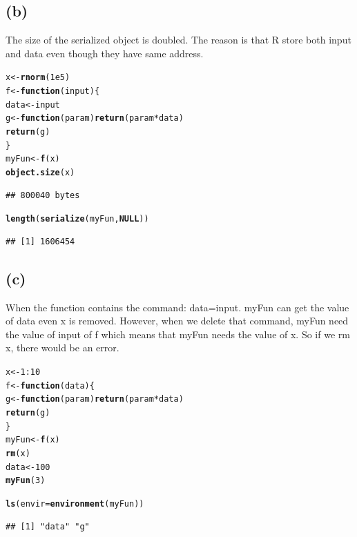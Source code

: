 \documentclass{article}\usepackage[]{graphicx}\usepackage[]{color}
\makeatletter
\newcommand{\hlnum}[1]{\textcolor[rgb]{0.686,0.059,0.569}{#1}}%
\newcommand{\hlopt}[1]{\textcolor[rgb]{0,0,0}{#1}}%
\newcommand{\hlstd}[1]{\textcolor[rgb]{0.345,0.345,0.345}{#1}}%
\newcommand{\hlkwa}[1]{\textcolor[rgb]{0.161,0.373,0.58}{\textbf{#1}}}%
\newcommand{\hlkwb}[1]{\textcolor[rgb]{0.69,0.353,0.396}{#1}}%
\newcommand{\hlkwc}[1]{\textcolor[rgb]{0.333,0.667,0.333}{#1}}%
\newcommand{\hlkwd}[1]{\textcolor[rgb]{0.737,0.353,0.396}{\textbf{#1}}}%
\newenvironment{kframe}{%
 \def\at@end@of@kframe{}%
 \ifinner\ifhmode%
  \def\at@end@of@kframe{\end{minipage}}%
  \begin{minipage}{\columnwidth}%
 \fi\fi%
 \def\FrameCommand##1{\hskip\@totalleftmargin \hskip-\fboxsep
 \colorbox{shadecolor}{##1}\hskip-\fboxsep
     \hskip-\linewidth \hskip-\@totalleftmargin \hskip\columnwidth}%
 \MakeFramed {\advance\hsize-\width
   \@totalleftmargin\z@ \linewidth\hsize
   \@setminipage}}%
 {\par\unskip\endMakeFramed%
 \at@end@of@kframe}
\newenvironment{knitrout}{}{} %
\makeatother
\begin{document}
\subsection{(b)}
The size of the serialized object is doubled. The reason is that R store both input and data even though they have same address.
\begin{knitrout}
\color{fgcolor}\begin{kframe}
\begin{alltt}
\hlstd{x} \hlkwb{<-} \hlkwd{rnorm}\hlstd{(}\hlnum{1e5}\hlstd{)}
\hlstd{f} \hlkwb{<-} \hlkwa{function}\hlstd{(}\hlkwc{input}\hlstd{)\{}
  \hlstd{data} \hlkwb{<-} \hlstd{input}
        \hlstd{g} \hlkwb{<-} \hlkwa{function}\hlstd{(}\hlkwc{param}\hlstd{)} \hlkwd{return}\hlstd{(param} \hlopt{*} \hlstd{data)}
        \hlkwd{return}\hlstd{(g)}
\hlstd{\}}
\hlstd{myFun} \hlkwb{<-} \hlkwd{f}\hlstd{(x)}
\hlkwd{object.size}\hlstd{(x)}
\end{alltt}
\begin{verbatim}
## 800040 bytes
\end{verbatim}
\begin{alltt}
\hlkwd{length}\hlstd{(}\hlkwd{serialize}\hlstd{(myFun,}\hlkwa{NULL}\hlstd{))}
\end{alltt}
\begin{verbatim}
## [1] 1606454
\end{verbatim}
\end{kframe}
\end{knitrout}


\subsection{(c)}
When the function contains the command: data=input. myFun can get the value of data even x is removed.
However, when we delete that command, myFun need the value of input of f which means that myFun needs the value of x. So if we rm x, there would be an error.
\begin{knitrout}
\color{fgcolor}\begin{kframe}
\begin{alltt}
\hlstd{x} \hlkwb{<-} \hlnum{1}\hlopt{:}\hlnum{10}
\hlstd{f} \hlkwb{<-} \hlkwa{function}\hlstd{(}\hlkwc{data}\hlstd{)\{}
  \hlstd{g} \hlkwb{<-} \hlkwa{function}\hlstd{(}\hlkwc{param}\hlstd{)} \hlkwd{return}\hlstd{(param} \hlopt{*} \hlstd{data)}
  \hlkwd{return}\hlstd{(g)}
\hlstd{\}}
\hlstd{myFun} \hlkwb{<-} \hlkwd{f}\hlstd{(x)}
\hlkwd{rm}\hlstd{(x)}
\hlstd{data} \hlkwb{<-} \hlnum{100}
\hlkwd{myFun}\hlstd{(}\hlnum{3}\hlstd{)}
\end{alltt}


{\ttfamily\noindent\bfseries\color{errorcolor}{\#\# Error in myFun(3): 找不到对象'x'}}\begin{alltt}
\hlkwd{ls}\hlstd{(}\hlkwc{envir}\hlstd{=}\hlkwd{environment}\hlstd{(myFun))}
\end{alltt}
\begin{verbatim}
## [1] "data" "g"
\end{verbatim}
\end{kframe}
\end{knitrout}
\end{document}
